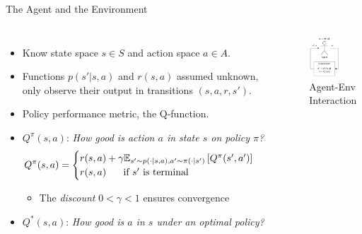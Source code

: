 \documentclass[aspectratio=1609,ADDITIONAL_DOCCLASS_ARGS]{beamer}
\begin{document}
\begin{frame}{The Agent and the Environment}
  \begin{columns}
      \begin{itemize}
      \setlength\itemsep{2mm}
      \item<1-> Know state space $s \in S$ and action space $a \in A$.
      \item<2-> Functions $p(s'|s,a)$ and $r(s,a)$ assumed unknown, only observe
            their output in transitions $(s, a, r, s')$.
      \item<3-> Policy performance metric, the Q-function.
      \item<4-> $Q^\pi(s,a)$: \emph{How good is action $a$ in state $s$ on policy $\pi$?}
            \[
            Q^\pi(s,a) = \begin{cases}
            r(s,a) + \gamma \mathbb{E}_{s' \sim p(\cdot|s,a), a' \sim \pi(\cdot|s')} \left[
                Q^\pi(s',a')
            \right]
            \\
            r(s,a) \text{\hspace{5mm} if } s' \text{ is terminal}
            \end{cases}
            \]
            \begin{itemize}
            \item The \emph{discount} $0 < \gamma < 1$ ensures convergence
            \end{itemize}

      \item<5-> $Q^*(s,a)$: \emph{How good is $a$ in $s$ under an optimal policy?}
      \end{itemize}
      \begin{figure}
        \includegraphics[width=0.65\textwidth]{img/agent-env.pdf}
        \caption{Agent-Env Interaction}
      \end{figure}
  \end{columns}
\end{frame}
\end{document}
